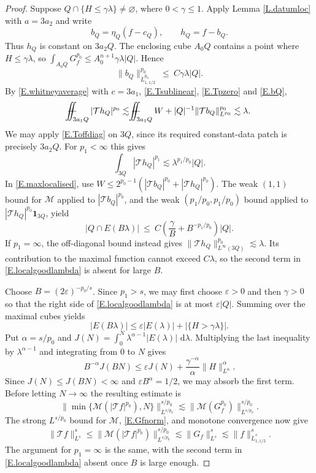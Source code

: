 \documentclass[12pt,leqno]{amsart}
\numberwithin{equation}{section}
\renewcommand{\d}{\,\mathrm d}
\def\Yint#1{\mathchoice
	{\YYint\displaystyle\textstyle{#1}}%
	{\YYint\textstyle\scriptstyle{#1}}%
	{\YYint\scriptstyle\scriptscriptstyle{#1}}%
	{\YYint\scriptscriptstyle\scriptscriptstyle{#1}}%
	\!\dint}
\newcommand{\dint}{\int\!\!\!\!\!\int}
\def\YYint#1#2#3{{\setbox0=\hbox{$#1{#2#3}{\iint}$}
		\vcenter{\hbox{$#2#3$}}\kern-.51\wd0}}
\def\longdash{\mkern-1.5mu{-}\mkern-7.5mu{-}}
\def\fiint{\Yint\longdash}
\theoremstyle{plain}
\theoremstyle{remark}
\begin{document}
\begin{proof}
Suppose $Q\cap\{H\le\gamma\lambda\}\ne\varnothing$, where $0<\gamma\le1$.
Apply Lemma \ref{L.datumloc} with $a=3a_2$ and write
\[
 b_Q=\eta_Q(f-c_Q),\qquad h_Q=f-b_Q.
\]
Thus $h_Q$ is constant on $3a_2Q$. The enclosing cube $A_0Q$ contains
a point where $H\le\gamma\lambda$, so
$\int_{A_0Q}G_f^{p_0}\le A_0^{n+1}\gamma\lambda|Q|$. Hence
\begin{equation}\label{E.bQ}
 \|b_Q\|_{\dot L^{p_0}_{1,1/2}}^{p_0}
 \ \le\ C\gamma\lambda|Q|.
\end{equation}
By \eqref{E.whitneyaverage} with $c=3a_1$,
\eqref{E.Tsublinear}, \eqref{E.Tpzero} and \eqref{E.bQ},
\[
 \fiint_{3a_1Q}|\mathcal T h_Q|^{p_0}
 \lesssim\fiint_{3a_1Q}W
       +|Q|^{-1}\|\mathcal T b_Q\|_{L^{p_0}}^{p_0}
 \lesssim\lambda.
\]
We may apply \eqref{E.Toffdiag} on $3Q$, since its required constant-data
patch is precisely $3a_2Q$. For $p_1<\infty$ this gives
\[
 \int_{3Q}|\mathcal T h_Q|^{p_1}
 \lesssim\lambda^{p_1/p_0}|Q|.
\]
In \eqref{E.maxlocalised}, use
$W\le2^{p_0-1}(|\mathcal T b_Q|^{p_0}
                  +|\mathcal T h_Q|^{p_0})$.
The weak $(1,1)$ bound for $\mathcal M$ applied to
$|\mathcal T b_Q|^{p_0}$, and the weak
$(p_1/p_0,p_1/p_0)$ bound applied to
$|\mathcal T h_Q|^{p_0}\mathbf1_{3Q}$, yield
\begin{equation}\label{E.localgoodlambda}
 |Q\cap E(B\lambda)|
 \ \le\ C\left(\frac\gamma B+B^{-p_1/p_0}\right)|Q|.
\end{equation}
If $p_1=\infty$, the off-diagonal bound instead gives
$\|\mathcal T h_Q\|_{L^\infty(3Q)}^{p_0}\lesssim\lambda$.
Its contribution to the maximal function cannot exceed $C\lambda$,
so the second term in \eqref{E.localgoodlambda} is absent for large $B$.

Choose $B=(2\varepsilon)^{-p_0/s}$. Since $p_1>s$, we may first choose
$\varepsilon>0$ and then $\gamma>0$ so that the right side of
\eqref{E.localgoodlambda} is at most $\varepsilon|Q|$. Summing over the
maximal cubes yields
\[
 |E(B\lambda)|\le\varepsilon|E(\lambda)|
                 +|\{H>\gamma\lambda\}|.
\]
Put $\alpha=s/p_0$ and
$J(N)=\int_0^N\lambda^{\alpha-1}|E(\lambda)|\,\d\lambda$.
Multiplying the last inequality by $\lambda^{\alpha-1}$ and integrating
from $0$ to $N$ gives
\[
 B^{-\alpha}J(BN)
 \le\varepsilon J(N)+\frac{\gamma^{-\alpha}}{\alpha}\|H\|_{L^\alpha}^{\alpha}.
\]
Since $J(N)\le J(BN)<\infty$ and $\varepsilon B^\alpha=1/2$,
we may absorb the first term. Before letting
$N\to\infty$ the resulting estimate is
\[
 \|\min\{\mathcal M(|\mathcal Tf|^{p_0}),N\}\|_{L^{s/p_0}}^{s/p_0}
 \lesssim \|\mathcal M(G_f^{p_0})\|_{L^{s/p_0}}^{s/p_0}.
\]
The strong $L^{s/p_0}$ bound for $\mathcal M$, \eqref{E.Gfnorm}, and monotone
convergence now give
\[
 \|\mathcal Tf\|_{L^s}^s
 \le\|\mathcal M(|\mathcal Tf|^{p_0})\|_{L^{s/p_0}}^{s/p_0}
 \lesssim\|G_f\|_{L^s}^s
 \lesssim\|f\|_{\dot L^s_{1,1/2}}^s.
\]
The argument for $p_1=\infty$ is the same, with the second term in
\eqref{E.localgoodlambda} absent once $B$ is large enough.
\end{proof}
\end{document}
